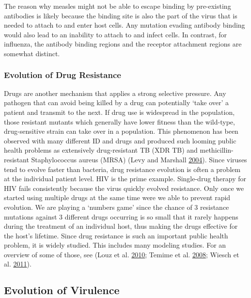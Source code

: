 \documentclass[]{article}
\theoremstyle{definition}
\theoremstyle{definition}
\theoremstyle{definition}
\theoremstyle{remark}
\begin{document}
The reason why measles might not be able to escape binding by
pre-existing antibodies is likely because the binding site is also the
part of the virus that is needed to attach to and enter host cells. Any
mutation evading antibody binding would also lead to an inability to
attach to and infect cells. In contrast, for influenza, the antibody
binding regions and the receptor attachment regions are somewhat
distinct.

\subsubsection{Evolution of Drug
Resistance}\label{evolution-of-drug-resistance}

Drugs are another mechanism that applies a strong selective pressure.
Any pathogen that can avoid being killed by a drug can potentially `take
over' a patient and transmit to the next. If drug use is widespread in
the population, those resistant mutants which generally have lower
fitness than the wild-type, drug-sensitive strain can take over in a
population. This phenomenon has been observed with many different ID and
drugs and produced such looming public health problems as extensively
drug-resistant TB (XDR TB) and methicillin-resistant Staphylococcus
aureus (MRSA) (Levy and Marshall \protect\hyperlink{ref-levy04}{2004}).
Since viruses tend to evolve faster than bacteria, drug resistance
evolution is often a problem at the individual patient level. HIV is the
prime example. Single-drug therapy for HIV fails consistently because
the virus quickly evolved resistance. Only once we started using
multiple drugs at the same time were we able to prevent rapid evolution.
We are playing a `numbers game' since the chance of 3 resistance
mutations against 3 different drugs occurring is so small that it rarely
happens during the treatment of an individual host, thus making the
drugs effective for the host's lifetime. Since drug resistance is such
an important public health problem, it is widely studied. This includes
many modeling studies. For an overview of some of those, see (Louz et
al. \protect\hyperlink{ref-louz10}{2010}; Temime et al.
\protect\hyperlink{ref-temime08}{2008}; Wiesch et al.
\protect\hyperlink{ref-wiesch11}{2011}).

\subsection{Evolution of Virulence}\label{evolution-of-virulence}
\end{document}
